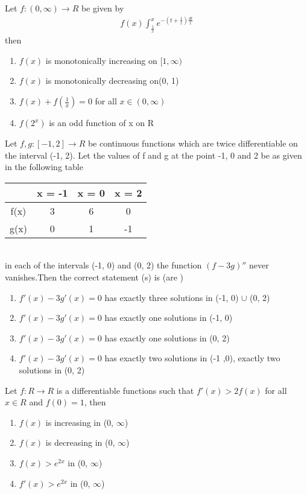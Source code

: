\item Let $f: (0, \infty) \to R$ be given by 
\begin{align*}
f(x)\int_{\frac{1}{x}}^{x} e^{-(t + \frac{1}{t})\frac{dt}{t}}
\end{align*}
then 
\begin{enumerate}
\item $f(x)$ is monotonically increasing on $[1, \infty)$
\item $f(x)$ is monotonically decreasing on(0, 1)
\item $f(x) + f(\frac{1}{x}) = 0$ for all $x \in (0, \infty)$
\item $f(2^x)$ is an odd function of x on R
\end{enumerate}

\item Let $f, g: [-1, 2] \to R$ be continuous functions which are twice differentiable on the interval (-1, 2). Let the values of f and g at the point -1, 0 and 2 be as given in the following table

\begin{tabular}{|c| c| c| c|} 
 \hline
  & x = -1 & x = 0 & x = 2 \\ 
 \hline
 f(x) & 3 & 6 & 0 \\ 
 \hline
 g(x) & 0 & 1 & -1 \\
 \hline
\end{tabular}\\

in each of the intervals (-1, 0) and (0, 2) the function $(f-3g)''$ never vanishes.Then the correct statement (s) is 
(are )
\begin{enumerate}
\item $f'(x) - 3g'(x) = 0$ has exactly three solutions in (-1, 0) $\cup$ (0, 2)
\item $f'(x) - 3g'(x) = 0$ has exactly one solutions in (-1, 0)
\item $f'(x) - 3g'(x) = 0$ has exactly one solutions in (0, 2)
\item $f'(x) - 3g'(x) = 0$ has exactly two solutions in (-1 ,0), exactly two solutions in (0, 2)
\end{enumerate}

\item Let $f: R \to R$ is a differentiable functions such that $f'(x) > 2f(x)$ for all $x \in R$ and $f(0) = 1$, then 
\begin{enumerate}
\item $f(x)$ is increasing in (0, $\infty$)
\item $f(x)$ is decreasing in (0, $\infty$)
\item $f(x) >  e^{2x}$ in (0, $\infty$)
\item $f'(x) > e^{2x}$ in (0, $\infty$)
\end{enumerate}

